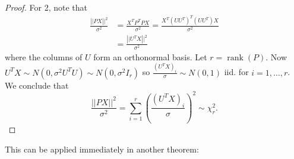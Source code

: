 \documentclass[egregdoesnotlikesansseriftitles,a4paper]{scrartcl}
\begin{document}
\begin{theorem}
\begin{proof}
            For 2, note that 
            \begin{align*}
               \frac{\left||PX\right||^2}{\sigma^2}&=\frac{X^TP^TPX}{\sigma^2}= \frac{X^T(UU^T)^T(UU^T)X}{\sigma^2}\\
               &=\frac{\left||U^TX\right||^2}{\sigma^2}
            \end{align*}
            where the columns of $U$ form an orthonormal basis. Let $r=\operatorname{rank}(P)$. Now $U^TX \sim N (0, \sigma^2 U^TU) \sim N (0, \sigma^2 I_{r})$ so $ \frac{(U^TX)_{i}}{\sigma} \sim N (0,1)$ iid. for $i= 1, \ldots, r$. We conclude that \[
               \frac{\left||PX\right||^2}{\sigma^2}= \sum_{i=1}^{r} \left(\frac{(U^TX)_{i}}{\sigma}\right)^2 \sim \chi^2_{r}
            .\] 
      \end{proof}
\end{theorem}
This can be applied immediately in another theorem:
\end{document}
